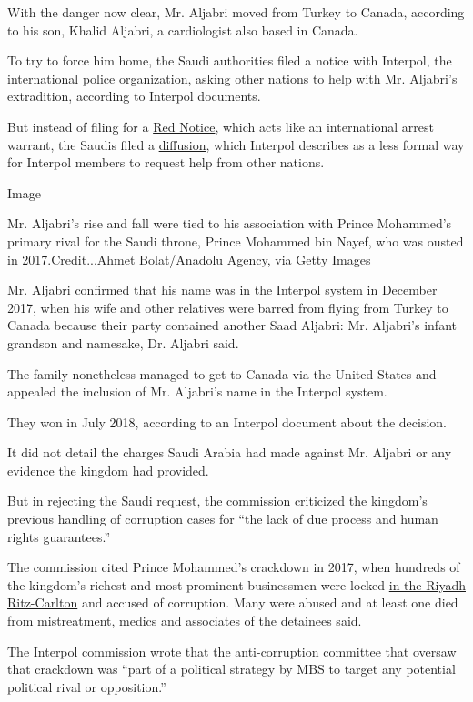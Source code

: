 With the danger now clear, Mr. Aljabri moved from Turkey to Canada,
according to his son, Khalid Aljabri, a cardiologist also based in
Canada.

To try to force him home, the Saudi authorities filed a notice with
Interpol, the international police organization, asking other nations to
help with Mr. Aljabri's extradition, according to Interpol documents.

But instead of filing for a
\href{https://www.interpol.int/en/How-we-work/Notices/Red-Notices}{Red
Notice}, which acts like an international arrest warrant, the Saudis
filed a
\href{https://www.interpol.int/en/How-we-work/Notices/About-Notices}{diffusion},
which Interpol describes as a less formal way for Interpol members to
request help from other nations.

Image

Mr. Aljabri's rise and fall were tied to his association with Prince
Mohammed's primary rival for the Saudi throne, Prince Mohammed bin
Nayef, who was ousted in 2017.Credit...Ahmet Bolat/Anadolu Agency, via
Getty Images

Mr. Aljabri confirmed that his name was in the Interpol system in
December 2017, when his wife and other relatives were barred from flying
from Turkey to Canada because their party contained another Saad
Aljabri: Mr. Aljabri's infant grandson and namesake, Dr. Aljabri said.

The family nonetheless managed to get to Canada via the United States
and appealed the inclusion of Mr. Aljabri's name in the Interpol system.

They won in July 2018, according to an Interpol document about the
decision.

It did not detail the charges Saudi Arabia had made against Mr. Aljabri
or any evidence the kingdom had provided.

But in rejecting the Saudi request, the commission criticized the
kingdom's previous handling of corruption cases for ``the lack of due
process and human rights guarantees.''

The commission cited Prince Mohammed's crackdown in 2017, when hundreds
of the kingdom's richest and most prominent businessmen were locked
\href{https://www.nytimes3xbfgragh.onion/2018/03/11/world/middleeast/saudi-arabia-corruption-mohammed-bin-salman.html}{in
the Riyadh Ritz-Carlton} and accused of corruption. Many were abused and
at least one died from mistreatment, medics and associates of the
detainees said.

The Interpol commission wrote that the anti-corruption committee that
oversaw that crackdown was ``part of a political strategy by MBS to
target any potential political rival or opposition.''

